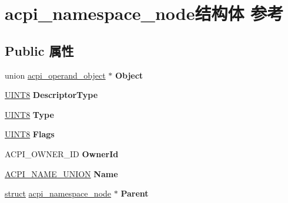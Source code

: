 \hypertarget{structacpi__namespace__node}{}\section{acpi\+\_\+namespace\+\_\+node结构体 参考}
\label{structacpi__namespace__node}
\subsection*{Public 属性}
\begin{DoxyCompactItemize}
\item 
\mbox{\label{structacpi__namespace__node_a0707a4ef33d45616dc674d532f0213b2}} 
union \hyperlink{unionacpi__operand__object}{acpi\+\_\+operand\+\_\+object} $\ast$ {\bfseries Object}
\item 
\mbox{\label{structacpi__namespace__node_aa186bd388bd80b2180406fdd813f2cbb}} 
\hyperlink{_processor_bind_8h_ab27e9918b538ce9d8ca692479b375b6a}{U\+I\+N\+T8} {\bfseries Descriptor\+Type}
\item 
\mbox{\label{structacpi__namespace__node_a6eaaed69ed290d354247917419c2a825}} 
\hyperlink{_processor_bind_8h_ab27e9918b538ce9d8ca692479b375b6a}{U\+I\+N\+T8} {\bfseries Type}
\item 
\mbox{\label{structacpi__namespace__node_a990829a69b36bc86194275ca25d5cf4e}} 
\hyperlink{_processor_bind_8h_ab27e9918b538ce9d8ca692479b375b6a}{U\+I\+N\+T8} {\bfseries Flags}
\item 
\mbox{\label{structacpi__namespace__node_a14a9faf97c10fe7c39665052f2ddd30f}} 
A\+C\+P\+I\+\_\+\+O\+W\+N\+E\+R\+\_\+\+ID {\bfseries Owner\+Id}
\item 
\mbox{\label{structacpi__namespace__node_a81420efd04a7febb801c39dc70b2b2ba}} 
\hyperlink{unionacpi__name__union}{A\+C\+P\+I\+\_\+\+N\+A\+M\+E\+\_\+\+U\+N\+I\+ON} {\bfseries Name}
\item 
\mbox{\label{structacpi__namespace__node_a6b7218d319ed807d781dea4fd32093e8}} 
\hyperlink{interfacestruct}{struct} \hyperlink{structacpi__namespace__node}{acpi\+\_\+namespace\+\_\+node} $\ast$ {\bfseries Parent}

\end{DoxyCompactItemize}
